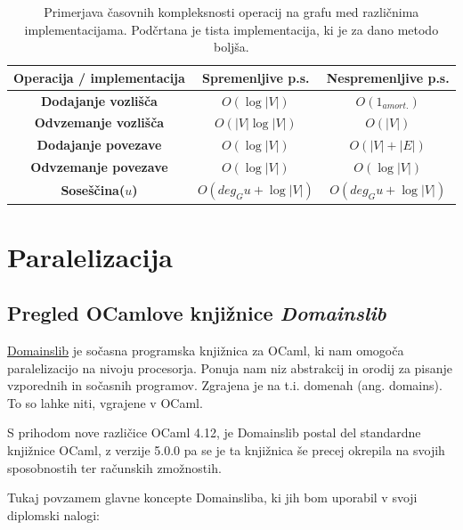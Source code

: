 \documentclass[mat1, tisk]{fmfdelo}
\begin{document}
\begin{table}[h]
  \centering
  \begin{tabular}{|c|c|c|}
  \hline
  \textbf{Operacija / implementacija} & \textbf{Spremenljive p.s.} & \textbf{Nespremenljive p.s.} \\ \hline
  \textbf{Dodajanje vozlišča} & $O(\log |V|)$ & \underline{$O(1_{amort.})$} \\ \hline
  \textbf{Odvzemanje vozlišča} & $O(|V| \log |V|)$ & \underline{$O(|V|)$} \\ \hline
  \textbf{Dodajanje povezave} & \underline{$O(\log |V|)$} & $O(|V| + |E|)$ \\ \hline
  \textbf{Odvzemanje povezave} & \underline{$O(\log |V|)$} & \underline{$O(\log |V|)$} \\ \hline
  \textbf{Soseščina($u$)} & \underline{$O(deg_Gu + \log |V|)$} & \underline{$O(deg_Gu + \log |V|)$} \\ \hline
  \end{tabular}
  \caption{Primerjava časovnih kompleksnosti operacij na grafu med različnima implementacijama. Podčrtana je tista 
  implementacija, ki je za dano metodo boljša.}
  \label{tab:primerjava_casovnih_kompleksnosti_operacij_na_grafu_med_razlicnima_implementacijama}
  \end{table}


\section{Paralelizacija}

\subsection{Pregled OCamlove knjižnice \textit{Domainslib}} \label{sec:pregled_domainslib}

\href{https://github.com/ocaml-multicore/domainslib}{Domainslib} je sočasna programska knjižnica za OCaml, 
ki nam omogoča paralelizacijo na nivoju procesorja.
Ponuja nam niz abstrakcij in orodij za pisanje vzporednih in sočasnih programov. 
Zgrajena je na t.i. domenah (ang. domains). To so lahke niti, vgrajene v OCaml.

S prihodom nove različice OCaml 4.12, je Domainslib postal del standardne knjižnice OCaml, z verzije 5.0.0 pa se je ta knjižnica
še precej okrepila na svojih sposobnostih ter računskih zmožnostih.

Tukaj povzamem glavne koncepte Domainsliba, ki jih bom uporabil v svoji diplomski nalogi:
\end{document}
